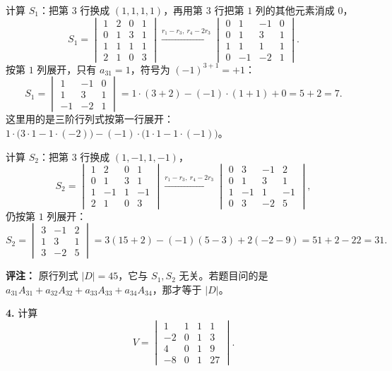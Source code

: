 计算 $S_1$：把第 $3$ 行换成 $(1,1,1,1)$，再用第 $3$ 行把第 $1$ 列的其他元素消成 $0$，
\[
S_1=\begin{vmatrix}
1&2&0&1\\
0&1&3&1\\
1&1&1&1\\
2&1&0&3
\end{vmatrix}
\xrightarrow{r_1-r_3,\ r_4-2r_3}
\begin{vmatrix}
0&1&-1&0\\
0&1&3&1\\
1&1&1&1\\
0&-1&-2&1
\end{vmatrix}.
\]
按第 $1$ 列展开，只有 $a_{31}=1$，符号为 $(-1)^{3+1}=+1$：
\[
S_1=\begin{vmatrix}
1&-1&0\\
1&3&1\\
-1&-2&1
\end{vmatrix}
=1\cdot(3+2)-(-1)\cdot(1+1)+0=5+2=7.
\]
这里用的是三阶行列式按第一行展开：$1\cdot\bigl(3\cdot1-1\cdot(-2)\bigr)-(-1)\cdot\bigl(1\cdot1-1\cdot(-1)\bigr)$。

计算 $S_2$：把第 $3$ 行换成 $(1,-1,1,-1)$，
\[
S_2=\begin{vmatrix}
1&2&0&1\\
0&1&3&1\\
1&-1&1&-1\\
2&1&0&3
\end{vmatrix}
\xrightarrow{r_1-r_3,\ r_4-2r_3}
\begin{vmatrix}
0&3&-1&2\\
0&1&3&1\\
1&-1&1&-1\\
0&3&-2&5
\end{vmatrix},
\]
仍按第 $1$ 列展开：
\[
S_2=\begin{vmatrix}
3&-1&2\\
1&3&1\\
3&-2&5
\end{vmatrix}
=3(15+2)-(-1)(5-3)+2(-2-9)=51+2-22=31.
\]

\textbf{评注：} 原行列式 $|D|=45$，它与 $S_1,S_2$ 无关。若题目问的是 $a_{31}A_{31}+a_{32}A_{32}+a_{33}A_{33}+a_{34}A_{34}$，那才等于 $|D|$。


\else \answerarea[8] \fi%

\textbf{4.} 计算
\[
V=\begin{vmatrix}
1&1&1&1\\
-2&0&1&3\\
4&0&1&9\\
-8&0&1&27
\end{vmatrix}.
\]

